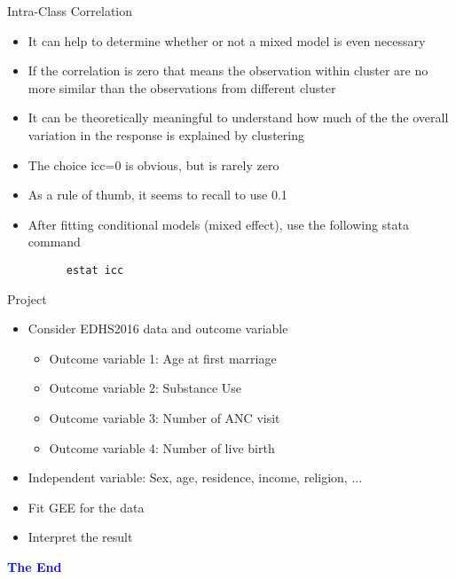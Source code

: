 \documentclass{beamer}
\begin{document}
\begin{frame}[fragile]{Intra-Class Correlation}
\begin{itemize}
	\item It can help to determine whether or not a mixed model is even necessary \vspace{0.25cm}
	
	\item If the correlation is zero that means the observation within cluster are no more similar than the observations from different cluster \vspace{0.25cm}
	\item It can be theoretically meaningful to understand how much of the the overall variation in the response is explained by clustering \vspace{0.25cm}
	\item The choice icc=0 is obvious, but is rarely zero \vspace{0.25cm}
	\item As a rule of thumb, it seems to recall to use 0.1
	\item After fitting conditional models (mixed effect), use the following stata command
	\begin{verbatim}
      estat icc
	\end{verbatim}

\end{itemize}
\end{frame}

\begin{frame}{Project}
\begin{itemize}
\item Consider EDHS2016 data and outcome variable \vspace{0.25cm}
\begin{itemize}
\item Outcome variable 1: Age at first marriage \vspace{0.25cm}
\item Outcome variable 2: Substance Use \vspace{0.25cm}
\item Outcome variable 3: Number of ANC visit \vspace{0.25cm}
\item Outcome variable 4: Number of live birth \vspace{0.25cm}
\end{itemize}
\item Independent variable: Sex, age, residence, income, religion, ... \vspace{0.25cm}
\item Fit GEE for the data \vspace{0.25cm}
\item Interpret the result
\end{itemize}
\end{frame}


\begin{frame}
\centering
\Large
\textbf{\textcolor{blue} {The End}}
\end{frame}
\end{document}
